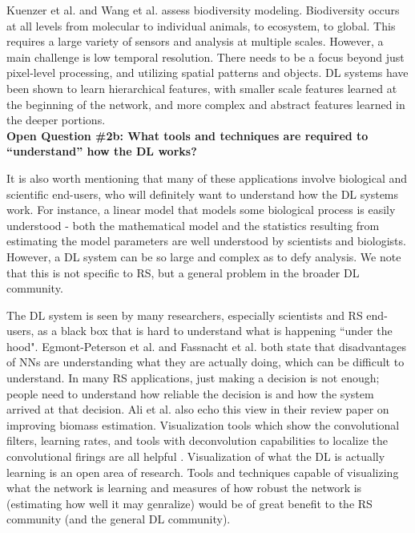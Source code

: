 \documentclass[12pt]{spieman}
\newcommand{\ParSection}[1]{}
\begin{document}
\begin{spacing}{1}
Kuenzer et al. \cite{kuenzer2014earth} and Wang et al. \cite{wang2010remote} assess biodiversity modeling. Biodiversity occurs at all levels from molecular to individual animals, to ecosystem, to global. This requires a large variety of sensors and analysis at multiple scales. However, a main challenge is low temporal resolution. There needs to be a focus beyond just pixel-level processing, and utilizing spatial patterns and objects. DL systems have been shown to learn hierarchical features, with smaller scale features learned at the beginning of the network, and more complex and abstract features learned in the deeper portions. \\

\textbf{Open Question \#2b: What tools and techniques are required to ``understand'' how the DL works?}
\ParSection{Human Understandable}

It is also worth mentioning that many of these applications involve biological and scientific end-users, who will definitely want to understand how the DL systems work. For instance, a linear model that models some biological process is easily understood - both the mathematical model and the statistics resulting from estimating the model parameters are well understood by scientists and biologists. However, a DL system can be so large and complex as to defy analysis. We note that this is not specific to RS, but a general problem in the broader DL community.

The DL system is seen by many researchers, especially scientists and RS end-users, as a black box that is hard to understand what is happening ``under the hood". Egmont-Peterson et al. \cite{Egmont-Petersen2002} and Fassnacht et al. \cite{fassnacht2016review} both state that disadvantages of NNs are understanding what they are actually doing, which can be difficult to understand. In many RS applications, just making a decision is not enough; people need to understand how reliable the decision is and how the system arrived at that decision. Ali et al. \cite{Ali2015} also echo this view in their review paper on improving biomass estimation. Visualization tools which show the convolutional filters, learning rates, and tools with deconvolution capabilities to localize the convolutional firings are all helpful \cite{mahendran2015understanding, yosinski2015understanding, zeiler2014visualizing, simonyan2013deep, erhan2009visualizing} . Visualization of what the DL is actually learning is an open area of research. Tools and techniques capable of visualizing what the network is learning and measures of how robust the network is (estimating how well it may genralize) would be of great benefit to the RS community (and the general DL community).



\end{spacing}
\end{document}
